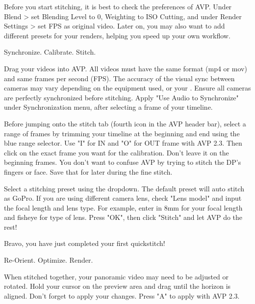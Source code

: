\begin{fullwidth}
\tip Before you start stitching, it is best to check the preferences of AVP. Under Blend > set Blending Level to 0, Weighting to ISO Cutting, and under Render Settings > set FPS as original video. Later on, you may also want to add different presets for your renders, helping you speed up your own workflow.


{\large Synchronize. Calibrate. Stitch. \par}

Drag your videos into AVP. All videos must have the same format (mp4 or mov) and same frames per second (FPS). The accuracy of the visual sync between cameras may vary depending on the equipment used, or your \textbf{}. Ensure all cameras are perfectly synchronized before stitching. Apply "Use Audio to Synchronize" under Synchronization menu, after selecting a frame of your timeline. 


Before jumping onto the stitch tab (fourth icon in the AVP header bar), select a range of frames by trimming your timeline at the beginning and end using the blue range selector. Use "I" for IN and "O" for OUT frame with AVP 2.3. Then click on the exact frame you want for the calibration. Don't leave it on the beginning frames. You don't want to confuse AVP by trying to stitch the DP's fingers or face. Save that for later during the fine stitch. 


Select a stitching preset using the dropdown. The default preset will auto stitch as GoPro. If you are using different camera lens, check "Lens model" and input the focal length and lens type. For example, enter in 8mm for your focal length and fisheye for type of lens. Press "OK", then click "Stitch" and let AVP do the rest!


Bravo, you have just completed your first quickstitch!

{\large Re-Orient. Optimize. Render. \par}

When stitched together, your panoramic video may need to be adjusted or rotated. Hold your cursor on the preview area and drag until the horizon is aligned. Don't forget to apply your changes. Press "A" to apply with AVP 2.3.



\end{fullwidth}
